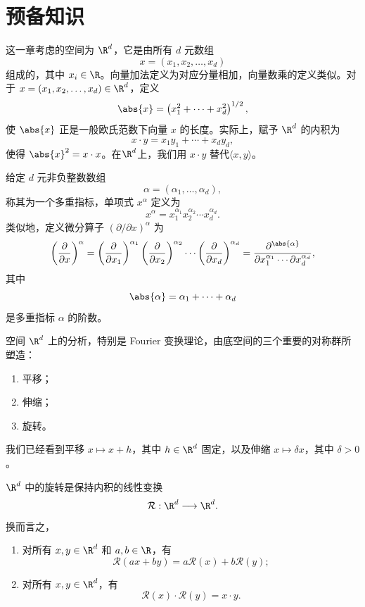\section{预备知识}

这一章考虑的空间为 $\R^d$，它是由所有 $d$ 元数组
\[
x=(x_1,x_2,\ldots,x_d)
\]
组成的，其中 $x_i\in\R$。向量加法定义为对应分量相加，向量数乘的定义类似。对于
$x=(x_1,x_2,\ldots,x_d)\in\R^d$，定义
\[
\abs{x}=\left(x_1^2+\cdots+x_d^2\right)^{1/2},
\]
使 $\abs{x}$ 正是一般欧氏范数下向量 $x$ 的长度。实际上，赋予 $\R^d$ 的内积为
\[
x\cdot y=x_1y_1+\cdots+x_dy_d,
\]
使得 $\abs{x}^2=x\cdot x$。在$\R^d$上，我们用 $x\cdot y$ 替代$\langle x,y\rangle$。

\begin{definition}
给定 $d$ 元非负整数数组
\[
\alpha=(\alpha_1,\ldots,\alpha_d),
\]
称其为一个多重指标，单项式 $x^\alpha$ 定义为
\[
x^\alpha=x_1^{\alpha_1}x_2^{\alpha_2}\cdots x_d^{\alpha_d}.
\]
类似地，定义微分算子 $(\partial/\partial x)^\alpha$ 为
\[
\left(\frac{\partial}{\partial x}\right)^\alpha
=\left(\frac{\partial}{\partial x_1}\right)^{\alpha_1}
 \left(\frac{\partial}{\partial x_2}\right)^{\alpha_2}
 \cdots
 \left(\frac{\partial}{\partial x_d}\right)^{\alpha_d}
=\frac{\partial^{\abs{\alpha}}}
{\partial x_1^{\alpha_1}\cdots\partial x_d^{\alpha_d}},
\]
其中
\[
\abs{\alpha}=\alpha_1+\cdots+\alpha_d
\]
是多重指标 $\alpha$ 的阶数。
\end{definition}

空间 $\R^d$ 上的分析，特别是 Fourier 变换理论，由底空间的三个重要的对称群所塑造：
\begin{enumerate}[label=(\roman*)]
	\item 平移；
	\item 伸缩；
	\item 旋转。
\end{enumerate}
我们已经看到平移 $x\longmapsto x+h$，其中 $h\in\R^d$ 固定，以及伸缩
$x\longmapsto\delta x$，其中 $\delta>0$。
\newpage
\begin{definition}
	$\R^d$ 中的旋转是保持内积的线性变换
	\[
	\mathcal{R}:\R^d\longrightarrow\R^d.
	\]
	换而言之，
	\begin{enumerate}[label=\textbullet]
		\item 对所有 $x,y\in\R^d$ 和 $a,b\in\R$，有
		\[
		\mathcal{R}(ax+by)=a\mathcal{R}(x)+b\mathcal{R}(y);
		\]
		\item 对所有 $x,y\in\R^d$，有
		\[
		\mathcal{R}(x)\cdot \mathcal{R}(y)=x\cdot y.
		\]
	\end{enumerate}
\end{definition}

